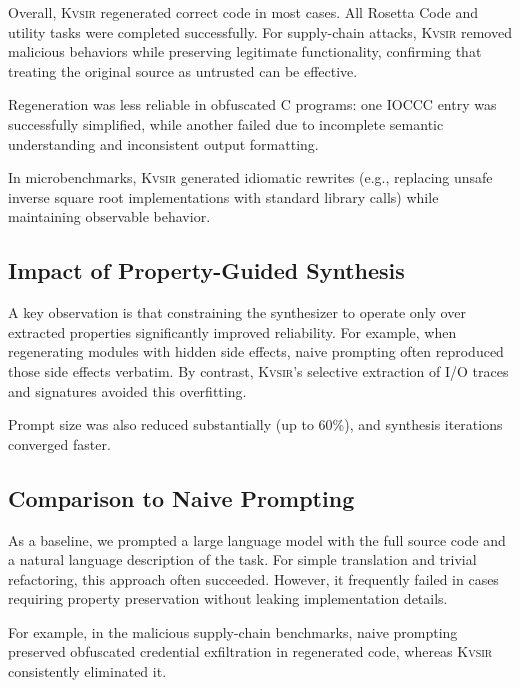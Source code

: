 \documentclass[sigplan,review,anonymous,10pt]{acmart}
\newcommand{\sys}{{\scshape Kv{\textalpha}sir}\xspace}
\begin{document}
Overall, \sys regenerated correct code in most cases. All Rosetta Code and utility tasks were completed successfully. For supply-chain attacks, \sys removed malicious behaviors while preserving legitimate functionality, confirming that treating the original source as untrusted can be effective. 

Regeneration was less reliable in obfuscated C programs: one IOCCC entry was successfully simplified, while another failed due to incomplete semantic understanding and inconsistent output formatting.

In microbenchmarks, \sys generated idiomatic rewrites (e.g., replacing unsafe inverse square root implementations with standard library calls) while maintaining observable behavior.

\subsection{Impact of Property-Guided Synthesis}

A key observation is that constraining the synthesizer to operate only over extracted properties significantly improved reliability. For example, when regenerating modules with hidden side effects, naive prompting often reproduced those side effects verbatim. By contrast, \sys’s selective extraction of I/O traces and signatures avoided this overfitting. 

Prompt size was also reduced substantially (up to 60\%), and synthesis iterations converged faster.

\subsection{Comparison to Naive Prompting}

As a baseline, we prompted a large language model with the full source code and a natural language description of the task. For simple translation and trivial refactoring, this approach often succeeded. However, it frequently failed in cases requiring property preservation without leaking implementation details. 

For example, in the malicious supply-chain benchmarks, naive prompting preserved obfuscated credential exfiltration in regenerated code, whereas \sys consistently eliminated it.

\end{document}
